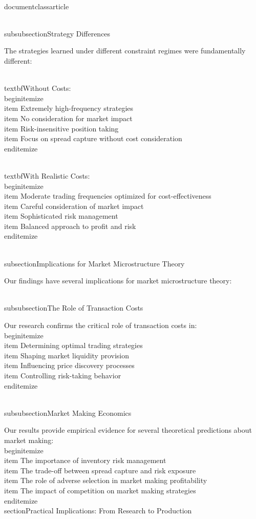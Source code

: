 \\documentclass{article}
\begin{document}
\\subsubsection{Strategy Differences}

The strategies learned under different constraint regimes were fundamentally different:

\\textbf{Without Costs}:
\\begin{itemize}
\\item Extremely high-frequency strategies
\\item No consideration for market impact
\\item Risk-insensitive position taking
\\item Focus on spread capture without cost consideration
\\end{itemize}

\\textbf{With Realistic Costs}:
\\begin{itemize}
\\item Moderate trading frequencies optimized for cost-effectiveness
\\item Careful consideration of market impact
\\item Sophisticated risk management
\\item Balanced approach to profit and risk
\\end{itemize}

\\subsection{Implications for Market Microstructure Theory}

Our findings have several implications for market microstructure theory:

\\subsubsection{The Role of Transaction Costs}

Our research confirms the critical role of transaction costs in:
\\begin{itemize}
\\item Determining optimal trading strategies
\\item Shaping market liquidity provision
\\item Influencing price discovery processes
\\item Controlling risk-taking behavior
\\end{itemize}

\\subsubsection{Market Making Economics}

Our results provide empirical evidence for several theoretical predictions about market making:
\\begin{itemize}
\\item The importance of inventory risk management
\\item The trade-off between spread capture and risk exposure
\\item The role of adverse selection in market making profitability
\\item The impact of competition on market making strategies
\\end{itemize}
\n\n
\\section{Practical Implications: From Research to Production}
\end{document}
